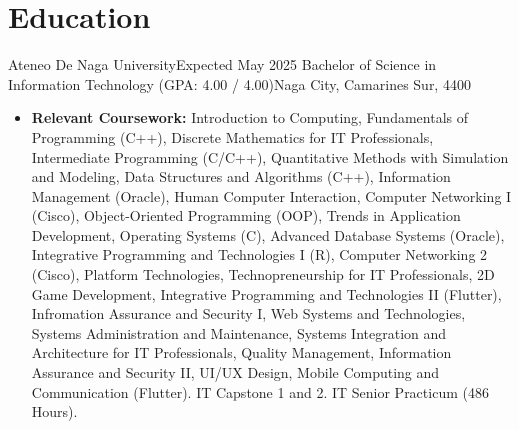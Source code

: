 \section{Education}
    \resumeSubHeadingListStart

    \resumeSubheading
    {Ateneo De Naga University}{Expected May 2025}
    {Bachelor of Science in Information Technology (GPA: 4.00 / 4.00)}{Naga City, Camarines Sur, 4400}
    \begin{itemize}
        \item[] \textbf{Relevant Coursework:} Introduction to Computing, Fundamentals of Programming (C++), Discrete Mathematics for IT Professionals, Intermediate Programming (C/C++), Quantitative Methods with Simulation and Modeling, Data Structures and Algorithms (C++), Information Management (Oracle), Human Computer Interaction, Computer Networking I (Cisco), Object-Oriented Programming (OOP), Trends in Application Development, Operating Systems (C), Advanced Database Systems (Oracle), Integrative Programming and Technologies I (R), Computer Networking 2 (Cisco), Platform Technologies, Technopreneurship for IT Professionals, 2D Game Development, Integrative Programming and Technologies II (Flutter), Infromation Assurance and Security I, Web Systems and Technologies, Systems Administration and Maintenance, Systems Integration and Architecture for IT Professionals, Quality Management, Information Assurance and Security II, UI/UX Design, Mobile Computing and Communication (Flutter). IT Capstone 1 and 2. IT Senior Practicum (486 Hours).
    \end{itemize}

    \resumeSubHeadingListEnd